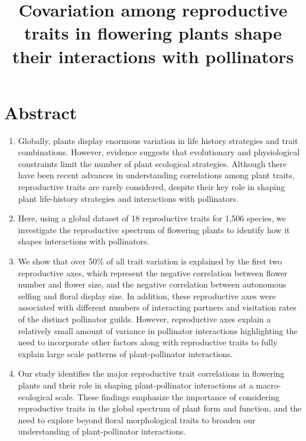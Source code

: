 \documentclass[
  12pt,
  a4paper,
]{article}
\title{\singlespacing \vspace{-1.6cm} \LARGE Covariation among reproductive traits in flowering plants shape their interactions with pollinators}
\author{}
\date{\vspace{-2.5em}}
\begin{document}
\maketitle

\doublespacing
\normalsize

\hypertarget{abstract}{%
\section{Abstract}\label{abstract}}

\begin{enumerate}
\def\labelenumi{\arabic{enumi}.}
\item
  Globally, plants display enormous variation in life history strategies and trait combinations. However, evidence suggests that evolutionary and physiological constraints limit the number of plant ecological strategies. Although there have been recent advances in understanding correlations among plant traits, reproductive traits are rarely considered, despite their key role in shaping plant life-history strategies and interactions with pollinators.
\item
  Here, using a global dataset of 18 reproductive traits for 1,506 species, we investigate the reproductive spectrum of flowering plants to identify how it shapes interactions with pollinators.
\item
  We show that over 50\% of all trait variation is explained by the first two reproductive axes, which represent the negative correlation between flower number and flower size, and the negative correlation between autonomous selfing and floral display size. In addition, these reproductive axes were associated with different numbers of interacting partners and visitation rates of the distinct pollinator guilds. However, reproductive axes explain a relatively small amount of variance in pollinator interactions highlighting the need to incorporate other factors along with reproductive traits to fully explain large scale patterns of plant-pollinator interactions.
\item
  Our study identifies the major reproductive trait correlations in flowering plants and their role in shaping plant-pollinator interactions at a macro-ecological scale. These findings emphasize the importance of considering reproductive traits in the global spectrum of plant form and function, and the need to explore beyond floral morphological traits to broaden our understanding of plant-pollinator interactions.
\end{enumerate}
\end{document}
